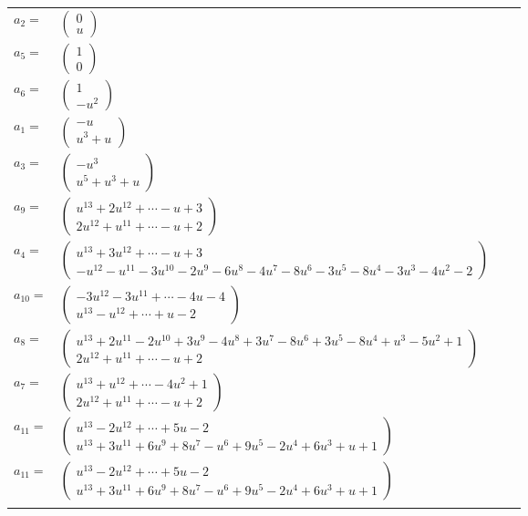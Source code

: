 \documentclass[1p]{elsarticle_modified}
\theoremstyle{definition}
\begin{document}
\begin{tabular}{m{7pt} m{180pt} m{7pt} m{180pt} }
\flushright $a_{2}=$&$\begin{pmatrix}0\\u\end{pmatrix}$ \\
\flushright $a_{5}=$&$\begin{pmatrix}1\\0\end{pmatrix}$ \\
\flushright $a_{6}=$&$\begin{pmatrix}1\\- u^2\end{pmatrix}$ \\
\flushright $a_{1}=$&$\begin{pmatrix}- u\\u^3+u\end{pmatrix}$ \\
\flushright $a_{3}=$&$\begin{pmatrix}- u^3\\u^5+u^3+u\end{pmatrix}$ \\
\flushright $a_{9}=$&$\begin{pmatrix}u^{13}+2 u^{12}+\cdots- u+3\\2 u^{12}+u^{11}+\cdots- u+2\end{pmatrix}$ \\
\flushright $a_{4}=$&$\begin{pmatrix}u^{13}+3 u^{12}+\cdots- u+3\\- u^{12}- u^{11}-3 u^{10}-2 u^9-6 u^8-4 u^7-8 u^6-3 u^5-8 u^4-3 u^3-4 u^2-2\end{pmatrix}$ \\
\flushright $a_{10}=$&$\begin{pmatrix}-3 u^{12}-3 u^{11}+\cdots-4 u-4\\u^{13}- u^{12}+\cdots+u-2\end{pmatrix}$ \\
\flushright $a_{8}=$&$\begin{pmatrix}u^{13}+2 u^{11}-2 u^{10}+3 u^9-4 u^8+3 u^7-8 u^6+3 u^5-8 u^4+u^3-5 u^2+1\\2 u^{12}+u^{11}+\cdots- u+2\end{pmatrix}$ \\
\flushright $a_{7}=$&$\begin{pmatrix}u^{13}+u^{12}+\cdots-4 u^2+1\\2 u^{12}+u^{11}+\cdots- u+2\end{pmatrix}$ \\
\flushright $a_{11}=$&$\begin{pmatrix}u^{13}-2 u^{12}+\cdots+5 u-2\\u^{13}+3 u^{11}+6 u^9+8 u^7- u^6+9 u^5-2 u^4+6 u^3+u+1\end{pmatrix}$\\ \flushright $a_{11}=$&$\begin{pmatrix}u^{13}-2 u^{12}+\cdots+5 u-2\\u^{13}+3 u^{11}+6 u^9+8 u^7- u^6+9 u^5-2 u^4+6 u^3+u+1\end{pmatrix}$\\&\end{tabular}
\end{document}
